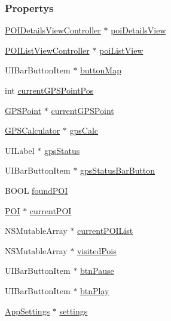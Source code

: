 \subsubsection*{Propertys}
\begin{DoxyCompactItemize}
\item 
\hyperlink{interface_p_o_i_details_view_controller}{POIDetailsViewController} $\ast$ \hyperlink{interface_map_view_controller_a306718a79bf2bf4553b90226aad82a1a}{poiDetailsView}
\item 
\hyperlink{interface_p_o_i_list_view_controller}{POIListViewController} $\ast$ \hyperlink{interface_map_view_controller_a29e38febc1e20365e2a84a25e84cea30}{poiListView}
\item 
UIBarButtonItem $\ast$ \hyperlink{interface_map_view_controller_a054673874ec0329457346065af298c0b}{buttonMap}
\item 
int \hyperlink{interface_map_view_controller_a8b5fb733f6bd00dd08f1cf90808f4420}{currentGPSPointPos}
\item 
\hyperlink{interface_g_p_s_point}{GPSPoint} $\ast$ \hyperlink{interface_map_view_controller_a623b304bb044927ee00052aeb5c18100}{currentGPSPoint}
\item 
\hyperlink{interface_g_p_s_calculator}{GPSCalculator} $\ast$ \hyperlink{interface_map_view_controller_a8da7a737d0d98fc23afd9e6dbf766026}{gpsCalc}
\item 
UILabel $\ast$ \hyperlink{interface_map_view_controller_ad0402524f486125ee10dff142c7b3ffd}{gpsStatus}
\item 
UIBarButtonItem $\ast$ \hyperlink{interface_map_view_controller_a64d3497885159ef092e213a71a5a7e42}{gpsStatusBarButton}
\item 
BOOL \hyperlink{interface_map_view_controller_ac4ce9dd86dc3db11a6573ae2bccfecc6}{foundPOI}
\item 
\hyperlink{interface_p_o_i}{POI} $\ast$ \hyperlink{interface_map_view_controller_a9c11e3ae9fc617f0c978ef3cf9f3e867}{currentPOI}
\item 
NSMutableArray $\ast$ \hyperlink{interface_map_view_controller_aa20f046169a89b035199e22efae744d2}{currentPOIList}
\item 
NSMutableArray $\ast$ \hyperlink{interface_map_view_controller_aa496b5d41e4cd44cd9c910b980667dc1}{visitedPois}
\item 
UIBarButtonItem $\ast$ \hyperlink{interface_map_view_controller_add41cd6cc9df20dd9a3bb3663913395a}{btnPause}
\item 
UIBarButtonItem $\ast$ \hyperlink{interface_map_view_controller_a3af316be6b8a063567aaf1720dede525}{btnPlay}
\item 
\hyperlink{interface_app_settings}{AppSettings} $\ast$ \hyperlink{interface_map_view_controller_a318f1f10cedf2e27f4ba6db3de2558b9}{settings}
\end{DoxyCompactItemize}


